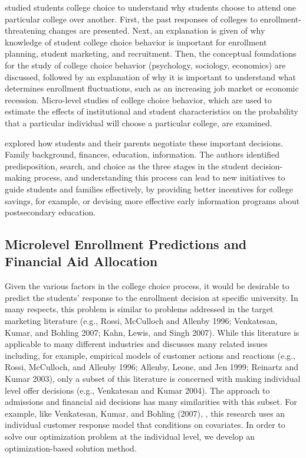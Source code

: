 \documentclass[12pt,english]{report}
\begin{document}
\citet{Paulsen1990} studied students college choice to understand why students
choose to attend one particular college over another. First, the past responses
of colleges to enrollment-threatening changes are presented. Next, an
explanation is given of why knowledge of student college choice behavior is
important for enrollment planning, student marketing, and recruitment. Then,
the conceptual foundations for the study of college choice behavior
(psychology, sociology, economics) are discussed, followed by an explanation of
why it is important to understand what determines enrollment fluctuations, such
as an increasing job market or economic recession. Micro-level studies of
college choice behavior, which are used to estimate the effects of
institutional and student characteristics on the probability that a particular
individual will choose a particular college, are examined.

\citet{Hossler1998} explored how students and their parents negotiate these
important decisions. Family background, finances, education, information. The
authors identified predisposition, search, and choice as the three stages in
the student decision-making process, and understanding this process can lead to
new initiatives to guide students and families effectively, by providing better
incentives for college savings, for example, or devising more effective early
information programs about postsecondary education.

\subsection{Microlevel Enrollment Predictions and Financial Aid Allocation} 
Given the various factors in the college choice process, it would be desirable
to predict the students' response to the enrollment decision at specific
university.  In many respects, this problem is similar to problems addressed in
the target marketing literature (e.g., Rossi, McCulloch and Allenby 1996;
Venkatesan, Kumar, and Bohling 2007; Kahn, Lewis, and Singh 2007). While this
literature is applicable to many different industries and discusses many
related issues including, for example, empirical models of customer actions and
reactions (e.g., Rossi, McCulloch, and Allenby 1996; Allenby, Leone, and Jen
1999; Reinartz and Kumar 2003), only a subset of this literature is concerned
with making individual level offer decisions (e.g., Venkatesan and Kumar 2004).
The approach to admissions and financial aid decisions has many similarities
with this subset.  For example, like Venkatesan, Kumar, and Bohling (2007),
\citep{Carter2011}, this research uses an individual customer response model
that conditions on covariates.  In order to solve our optimization problem at
the individual level, we develop an optimization-based solution method.
\end{document}
